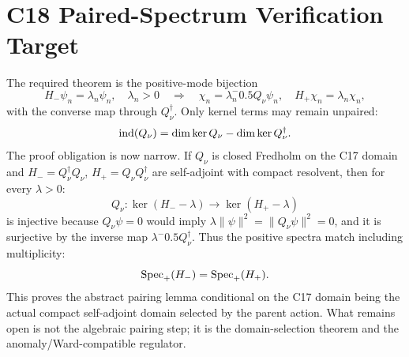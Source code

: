 \documentclass[11pt]{article}
\begin{document}
\section{C18 Paired-Spectrum Verification Target}
The required theorem is the positive-mode bijection
\begin{equation}
H_-\psi_n=\lambda_n\psi_n,\quad \lambda_n>0
\quad\Longrightarrow\quad
\chi_n=\lambda_n^-0.5Q_\nu\psi_n,\quad H_+\chi_n=\lambda_n\chi_n,
\end{equation}
with the converse map through $Q_\nu^\dagger$.  Only kernel terms may remain
unpaired:
\begin{equation}
{\rm ind}(Q_\nu)=\dim\ker Q_\nu-\dim\ker Q_\nu^\dagger .
\end{equation}
The proof obligation is now narrow.  If $Q_\nu$ is closed Fredholm on the C17
domain and $H_-=Q_\nu^\dagger Q_\nu$, $H_+=Q_\nu Q_\nu^\dagger$ are
self-adjoint with compact resolvent, then for every $\lambda>0$:
\begin{equation}
Q_\nu:\ker(H_- -\lambda)\longrightarrow\ker(H_+-\lambda)
\end{equation}
is injective because $Q_\nu\psi=0$ would imply
$\lambda\|\psi\|^2=\|Q_\nu\psi\|^2=0$, and it is surjective by the inverse map
$\lambda^-0.5Q_\nu^\dagger$.  Thus the positive spectra match including
multiplicity:
\begin{equation}
{\rm Spec}_+(H_-)= {\rm Spec}_+(H_+).
\end{equation}
This proves the abstract pairing lemma conditional on the C17 domain being the
actual compact self-adjoint domain selected by the parent action.  What remains
open is not the algebraic pairing step; it is the domain-selection theorem and
the anomaly/Ward-compatible regulator.
\end{document}
